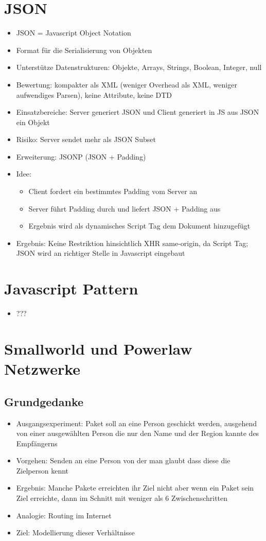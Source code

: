 \documentclass{article} %
\begin{document}
	\section{JSON}
	\begin{itemize}
		\item JSON = Javascript Object Notation
		\item Format für die Serialisierung von Objekten
		\item Unterstütze Datenstrukturen: Objekte, Arrays, Strings, Boolean, Integer, null
		\item Bewertung: kompakter als XML (weniger Overhead als XML, weniger aufwendiges Parsen), keine Attribute, keine DTD
		\item Einsatzbereiche: Server generiert JSON und Client generiert in JS aus JSON ein Objekt
		\item Risiko: Server sendet mehr als JSON Subset
		\item Erweiterung: JSONP (JSON + Padding)
		\item Idee: 
		\begin{itemize}
			\item Client fordert ein bestimmtes Padding vom Server an
			\item Server führt Padding durch und liefert JSON + Padding aus
			\item Ergebnis wird als dynamisches Script Tag dem Dokument hinzugefügt
		\end{itemize}
		\item Ergebnis: Keine Restriktion hinsichtlich XHR same-origin, da Script Tag; JSON wird an richtiger Stelle in Javascript eingebaut
	\end{itemize}
	\section{Javascript Pattern}
	\begin{itemize}
		\item ???
	\end{itemize}
	\section{Smallworld und Powerlaw Netzwerke}
	\subsection{Grundgedanke}
	\begin{itemize}
		\item Ausgangsexperiment: Paket soll an eine Person geschickt werden, ausgehend von einer ausgewählten Person die nur den Name und der Region kannte des Empfängerns
		\item Vorgehen: Senden an eine Person von der man glaubt dass diese die Zielperson kennt
		\item Ergebnis: Manche Pakete erreichten ihr Ziel nicht aber wenn ein Paket sein Ziel erreichte,
		dann im Schnitt mit weniger als 6 Zwischenschritten
		\item Analogie: Routing im Internet
		\item Ziel: Modellierung dieser Verhältnisse
	\end{itemize}
\end{document}
